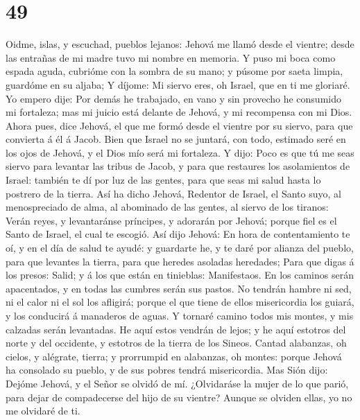 \hypertarget{section-48}{%
\section{49}\label{section-48}}

 Oidme, islas, y escuchad, pueblos lejanos: Jehová me llamó
desde el vientre; desde las entrañas de mi madre tuvo mi nombre en
memoria.  Y puso mi boca como espada aguda, cubrióme con la
sombra de su mano; y púsome por saeta limpia, guardóme en su aljaba;
 Y díjome: Mi siervo eres, oh Israel, que en ti me gloriaré.
 Yo empero dije: Por demás he trabajado, en vano y sin
provecho he consumido mi fortaleza; mas mi juicio está delante de
Jehová, y mi recompensa con mi Dios.  Ahora pues, dice
Jehová, el que me formó desde el vientre por su siervo, para que
convierta á él á Jacob. Bien que Israel no se juntará, con todo,
estimado seré en los ojos de Jehová, y el Dios mío será mi fortaleza.
 Y dijo: Poco es que tú me seas siervo para levantar las
tribus de Jacob, y para que restaures los asolamientos de Israel:
también te dí por luz de las gentes, para que seas mi salud hasta lo
postrero de la tierra.  Así ha dicho Jehová, Redentor de
Israel, el Santo suyo, al menospreciado de alma, al abominado de las
gentes, al siervo de los tiranos: Verán reyes, y levantaránse príncipes,
y adorarán por Jehová; porque fiel es el Santo de Israel, el cual te
escogió.  Así dijo Jehová: En hora de contentamiento te oí,
y en el día de salud te ayudé: y guardarte he, y te daré por alianza del
pueblo, para que levantes la tierra, para que heredes asoladas
heredades;  Para que digas á los presos: Salid; y á los que
están en tinieblas: Manifestaos. En los caminos serán apacentados, y en
todas las cumbres serán sus pastos.  No tendrán hambre ni
sed, ni el calor ni el sol los afligirá; porque el que tiene de ellos
misericordia los guiará, y los conducirá á manaderos de aguas.
 Y tornaré camino todos mis montes, y mis calzadas serán
levantadas.  He aquí estos vendrán de lejos; y he aquí
estotros del norte y del occidente, y estotros de la tierra de los
Sineos.  Cantad alabanzas, oh cielos, y alégrate, tierra; y
prorrumpid en alabanzas, oh montes: porque Jehová ha consolado su
pueblo, y de sus pobres tendrá misericordia.  Mas Sión
dijo: Dejóme Jehová, y el Señor se olvidó de mí. 
¿Olvidaráse la mujer de lo que parió, para dejar de compadecerse del
hijo de su vientre? Aunque se olviden ellas, yo no me olvidaré de ti.
